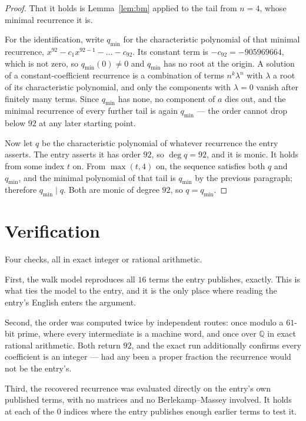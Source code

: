\documentclass[11pt,a4paper]{article}
\theoremstyle{plain}
\theoremstyle{definition}
\begin{document}
\begin{proof}
That it holds is Lemma~\ref{lem:bm} applied to the tail from $n=4$, whose minimal
recurrence it is.

For the identification, write $q_{\min}$ for the characteristic polynomial of that minimal
recurrence, $x^{92}-c_1x^{92-1}-\dots-c_{92}$. Its constant term is
$-c_{92}=-905969664$, which is not zero, so $q_{\min}(0)\neq0$ and $q_{\min}$ has no
root at the origin. A solution of a constant-coefficient recurrence is a combination of terms
$n^{k}\lambda^{n}$ with $\lambda$ a root of its characteristic polynomial, and only the
components with $\lambda=0$ vanish after finitely many terms. Since $q_{\min}$ has none, no
component of $a$ dies out, and the minimal recurrence of every further tail is again
$q_{\min}$ --- the order cannot drop below $92$ at any later starting point.

Now let $q$ be the characteristic polynomial of whatever recurrence the entry asserts. The
entry asserts it has order $92$, so $\deg q=92$, and it is monic. It holds from some
index $t$ on. From $\max(t,4)$ on, the sequence satisfies both $q$ and $q_{\min}$, and
the minimal polynomial of that tail is $q_{\min}$ by the previous paragraph; therefore
$q_{\min}\mid q$. Both are monic of degree $92$, so $q=q_{\min}$.
\end{proof}

\section{Verification}

Four checks, all in exact integer or rational arithmetic.

First, the walk model reproduces all $16$ terms the entry publishes, exactly. This is
what ties the model to the entry, and it is the only place where reading the entry's English
enters the argument.

Second, the order was computed twice by independent routes: once modulo a $61$-bit prime, where
every intermediate is a machine word, and once over $\mathbb{Q}$ in exact rational arithmetic.
Both return $92$, and the exact run additionally confirms every coefficient is an integer
--- had any been a proper fraction the recurrence would not be the entry's.

Third, the recovered recurrence was evaluated directly on the entry's own published terms, with
no matrices and no Berlekamp--Massey involved. It holds at each of the $0$ indices where
the entry publishes enough earlier terms to test it.
\end{document}
